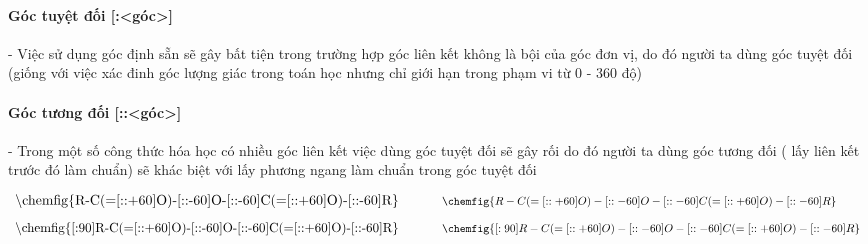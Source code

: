 \documentclass[Main.tex]{subfiles}
\begin{document}
	\begin{vd}[thay đổi góc đơn vị <angle increment = 〈angle〉>]
	\end{vd}

	\paragraph{Góc tuyệt đối [:<góc>]}
	- Việc sử dụng góc định sẵn sẽ gây bất tiện trong trường hợp góc liên kết không là bội của góc đơn vị, do đó người ta dùng góc tuyệt đối (giống với việc xác đinh góc lượng giác trong toán học nhưng chỉ giới hạn trong phạm vi từ 0 - 360 độ)
		\begin{vd}
		\end{vd}
	\paragraph{Góc tương đối [::<góc>]}
	- Trong một số công thức hóa học có nhiều góc liên kết việc dùng góc tuyệt đối sẽ gây rối do đó người ta dùng góc tương đối ( lấy liên kết trước đó làm chuẩn) sẽ khác biệt với lấy phương ngang làm chuẩn trong góc tuyệt đối
	\begin{vd}
	$\begin{array}{ll}
	\resizebox{12cm}{!}{\textbackslash{}chemfig\{R-C(=[::+60]O)-[::-60]O-[::-60]C(=[::+60]O)-[::-60]R\}}&\hspace{1cm}\chemfig{R-C(=[::+60]O)-[::-60]O-[::-60]C(=[::+60]O)-[::-60]R}\\
	&\\
	\resizebox{12cm}{!}{\textbackslash{}chemfig\{[:90]R-C(=[::+60]O)-[::-60]O-[::-60]C(=[::+60]O)-[::-60]R\}}&\hspace{1cm}\chemfig{[:90]R-C(=[::+60]O)-[::-60]O-[::-60]C(=[::+60]O)-[::-60]R}
	\end{array}$
	\end{vd}
\end{document}
